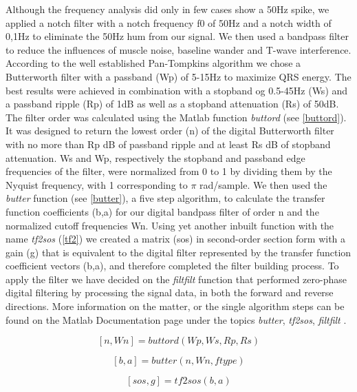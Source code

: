 Although the frequency analysis did only in few cases show a 50Hz spike, we applied a notch filter with a notch frequency f0 of 50Hz and a notch width of 0,1Hz to eliminate the 50Hz hum from our signal. We then used a bandpass filter to reduce the influences of muscle noise, baseline wander and T-wave interference. According to the well established Pan-Tompkins algorithm \cite{PANTOM1985} we chose a Butterworth filter with a passband (Wp) of 5-15Hz to maximize QRS energy. The best results were achieved in combination with a stopband og 0.5-45Hz (Ws) and a passband ripple (Rp) of 1dB as well as a stopband attenuation (Rs) of 50dB. The filter order was calculated using the Matlab function \textit{buttord} (see \ref{buttord}). It was designed to return the lowest order (n) of the digital Butterworth filter with no more than Rp dB of passband ripple and at least Rs dB of stopband attenuation. Ws and Wp, respectively the stopband and passband edge frequencies of the filter, were normalized from 0 to 1 by dividing them by the Nyquist frequency, with 1 corresponding to $\pi$ rad/sample. We then used the \textit{butter}  function (see \ref{butter}), a five step algorithm, to calculate the transfer function coefficients (b,a) for our digital bandpass filter of order n and the normalized cutoff frequencies Wn. Using yet another inbuilt function with the name \textit{tf2sos} (\ref{tf2}) we created a matrix (sos) in second-order section form with a gain (g) that is equivalent to the digital filter represented by the transfer function coefficient vectors (b,a), and therefore completed the filter building process. To apply the filter we have decided on the \textit{filtfilt} function that performed zero-phase digital filtering by processing the signal data, in both the forward and reverse directions. More information on the matter, or the single algorithm steps can be found on the Matlab Documentation page under the topics \textit{butter}, \textit{tf2sos}, \textit{filtfilt} \cite{MATDOC}.  

\begin{equation}\label{buttord}
[n,Wn] = buttord(Wp,Ws,Rp,Rs)
\end{equation}

\begin{equation}\label{butter}
[b,a] = butter(n,Wn,ftype)
\end{equation}

\begin{equation}\label{tf2}
[sos,g] = tf2sos(b,a)
\end{equation}

